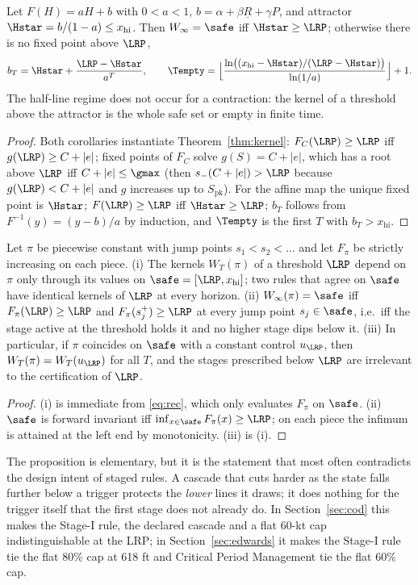 \begin{corollary}\label{cor:edw}
Let $F(H)=aH+b$ with $0<a<1$, $b=\alpha+\beta\underline R+\gamma P$, and attractor $\Hstar=b/(1-a)\le x_{\mathrm{hi}}$. Then $W_\infty=\safe$ iff $\Hstar\ge\LRP$; otherwise there is no fixed point above $\LRP$,
\[
b_T=\Hstar+\frac{\LRP-\Hstar}{a^{T}},\qquad \Tempty=\Bigl\lfloor\frac{\ln\bigl((x_{\mathrm{hi}}-\Hstar)/(\LRP-\Hstar)\bigr)}{\ln(1/a)}\Bigr\rfloor+1 .
\]
The half-line regime does not occur for a contraction: the kernel of a threshold above the attractor is the whole safe set or empty in finite time.
\end{corollary}
\begin{proof}
Both corollaries instantiate Theorem~\ref{thm:kernel}: $F_C(\LRP)\ge\LRP$ iff $g(\LRP)\ge C+|e|$; fixed points of $F_C$ solve $g(S)=C+|e|$, which has a root above $\LRP$ iff $C+|e|\le\gmax$ (then $s_-(C+|e|)>\LRP$ because $g(\LRP)<C+|e|$ and $g$ increases up to $S_{\mathrm{pk}}$). For the affine map the unique fixed point is $\Hstar$; $F(\LRP)\ge\LRP$ iff $\Hstar\ge\LRP$; $b_T$ follows from $F^{-1}(y)=(y-b)/a$ by induction, and $\Tempty$ is the first $T$ with $b_T>x_{\mathrm{hi}}$.
\end{proof}

\begin{proposition}\label{prop:stage}
Let $\pi$ be piecewise constant with jump points $s_1<s_2<\dots$ and let $F_\pi$ be strictly increasing on each piece. (i) The kernels $W_T(\pi)$ of a threshold $\LRP$ depend on $\pi$ only through its values on $\safe=[\LRP,x_{\mathrm{hi}}]$; two rules that agree on $\safe$ have identical kernels of $\LRP$ at every horizon. (ii) $W_\infty(\pi)=\safe$ iff $F_\pi(\LRP)\ge\LRP$ and $F_\pi(s_j^{+})\ge\LRP$ at every jump point $s_j\in\safe$, i.e.\ iff the stage active at the threshold holds it and no higher stage dips below it. (iii) In particular, if $\pi$ coincides on $\safe$ with a constant control $u_\LRP$, then $W_T(\pi)=W_T(u_\LRP)$ for all $T$, and the stages prescribed below $\LRP$ are irrelevant to the certification of $\LRP$.
\end{proposition}
\begin{proof}
(i) is immediate from \eqref{eq:rec}, which only evaluates $F_\pi$ on $\safe$. (ii) $\safe$ is forward invariant iff $\inf_{x\in\safe}F_\pi(x)\ge\LRP$; on each piece the infimum is attained at the left end by monotonicity. (iii) is (i).
\end{proof}

The proposition is elementary, but it is the statement that most often contradicts the design intent of staged rules. A cascade that cuts harder as the state falls further below a trigger protects the \emph{lower} lines it draws; it does nothing for the trigger itself that the first stage does not already do. In Section~\ref{sec:cod} this makes the Stage-I rule, the declared cascade and a flat 60-kt cap indistinguishable at the LRP; in Section~\ref{sec:edwards} it makes the Stage-I rule tie the flat 80\% cap at 618 ft and Critical Period Management tie the flat 60\% cap.

